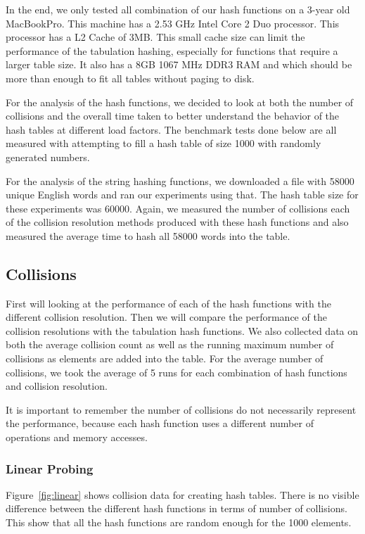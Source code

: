 \documentclass[11pt]{article}
\begin{document}
In the end, we only tested all combination of our hash functions on a 3-year old MacBookPro.
This machine has a  2.53 GHz Intel Core 2 Duo processor. This processor has a L2 Cache of 3MB.
This small cache size can limit the performance of the tabulation hashing, especially for functions
that require a larger table size.
It also has a 8GB 1067 MHz DDR3 RAM and which should be more than enough to fit all tables
without paging to disk.

For the analysis of the hash functions, we decided to look at both the number of collisions
 and the overall time taken to better understand the behavior of the hash tables at 
 different load factors. The benchmark tests done below are all measured with 
 attempting to fill a hash table of size 1000 with randomly generated numbers.
 
 For the analysis of the string hashing functions, we downloaded a file with 58000 unique English words and ran our experiments using that. The hash table size for these experiments was 60000. Again, we measured the number of collisions each of the collision resolution methods produced with these hash functions and also measured the average time to hash all 58000 words into the table.

\subsection{Collisions}
First will looking at the performance of each of the hash functions with the 
different collision resolution. Then we will compare the performance of the
collision resolutions with the tabulation hash functions. We also collected data on 
both the average collision count  as well as the running maximum 
number of collisions as elements are added into the table. For the average number of collisions,
we took the average of 5 runs for each combination of hash functions and collision resolution.

It is important to remember the number of collisions do not necessarily 
represent the performance, because each hash function uses a different 
number of operations and memory accesses.

\subsubsection{Linear Probing}
Figure~\ref{fig:linear} shows collision data for creating hash tables. 
There is no visible difference between the different hash functions in
terms of number of collisions. This show that all the hash functions are 
random enough for the 1000 elements. 
\end{document}
